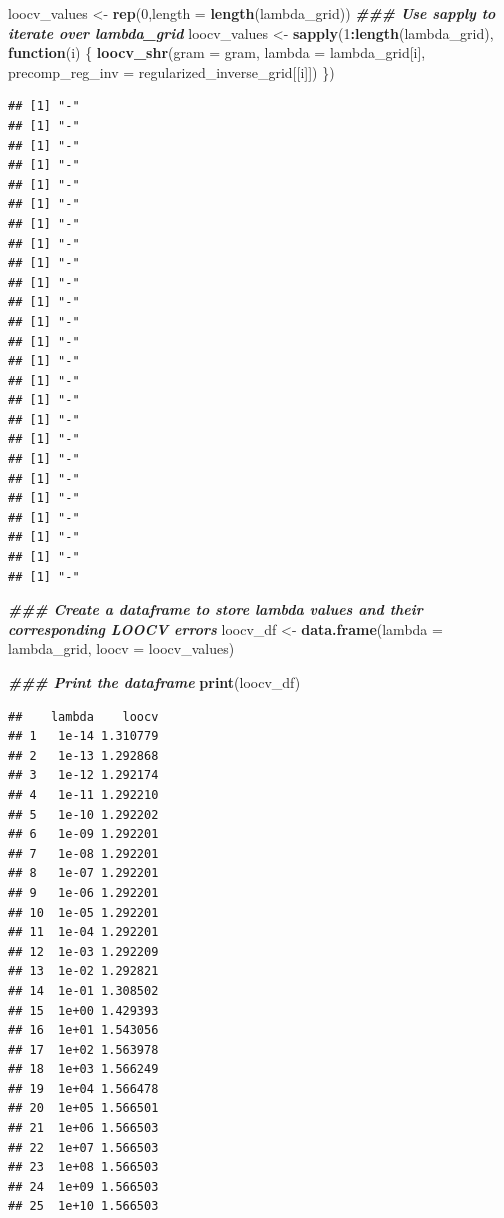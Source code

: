 \documentclass[
]{article}
\newenvironment{Shaded}{\begin{snugshade}}{\end{snugshade}}
\newcommand{\AttributeTok}[1]{\textcolor[rgb]{0.13,0.29,0.53}{#1}}
\newcommand{\ControlFlowTok}[1]{\textcolor[rgb]{0.13,0.29,0.53}{\textbf{#1}}}
\newcommand{\DecValTok}[1]{\textcolor[rgb]{0.00,0.00,0.81}{#1}}
\newcommand{\DocumentationTok}[1]{\textcolor[rgb]{0.56,0.35,0.01}{\textbf{\textit{#1}}}}
\newcommand{\FunctionTok}[1]{\textcolor[rgb]{0.13,0.29,0.53}{\textbf{#1}}}
\newcommand{\NormalTok}[1]{#1}
\newcommand{\OtherTok}[1]{\textcolor[rgb]{0.56,0.35,0.01}{#1}}
\newcommand{\SpecialCharTok}[1]{\textcolor[rgb]{0.81,0.36,0.00}{\textbf{#1}}}
\begin{document}
\begin{Shaded}
\begin{Highlighting}[]
\NormalTok{loocv\_values }\OtherTok{\textless{}{-}} \FunctionTok{rep}\NormalTok{(}\DecValTok{0}\NormalTok{,}\AttributeTok{length =} \FunctionTok{length}\NormalTok{(lambda\_grid))}
\DocumentationTok{\#\#\# Use sapply to iterate over lambda\_grid}
\NormalTok{loocv\_values }\OtherTok{\textless{}{-}} \FunctionTok{sapply}\NormalTok{(}\DecValTok{1}\SpecialCharTok{:}\FunctionTok{length}\NormalTok{(lambda\_grid), }\ControlFlowTok{function}\NormalTok{(i) \{}
  \FunctionTok{loocv\_shr}\NormalTok{(}\AttributeTok{gram =}\NormalTok{ gram, }\AttributeTok{lambda =}\NormalTok{ lambda\_grid[i], }\AttributeTok{precomp\_reg\_inv =}\NormalTok{ regularized\_inverse\_grid[[i]])}
\NormalTok{\})}
\end{Highlighting}
\end{Shaded}

\begin{verbatim}
## [1] "-"
## [1] "-"
## [1] "-"
## [1] "-"
## [1] "-"
## [1] "-"
## [1] "-"
## [1] "-"
## [1] "-"
## [1] "-"
## [1] "-"
## [1] "-"
## [1] "-"
## [1] "-"
## [1] "-"
## [1] "-"
## [1] "-"
## [1] "-"
## [1] "-"
## [1] "-"
## [1] "-"
## [1] "-"
## [1] "-"
## [1] "-"
## [1] "-"
\end{verbatim}

\begin{Shaded}
\begin{Highlighting}[]
\DocumentationTok{\#\#\# Create a dataframe to store lambda values and their corresponding LOOCV errors}
\NormalTok{loocv\_df }\OtherTok{\textless{}{-}} \FunctionTok{data.frame}\NormalTok{(}\AttributeTok{lambda =}\NormalTok{ lambda\_grid, }\AttributeTok{loocv =}\NormalTok{ loocv\_values)}

\DocumentationTok{\#\#\# Print the dataframe}
\FunctionTok{print}\NormalTok{(loocv\_df)}
\end{Highlighting}
\end{Shaded}

\begin{verbatim}
##    lambda    loocv
## 1   1e-14 1.310779
## 2   1e-13 1.292868
## 3   1e-12 1.292174
## 4   1e-11 1.292210
## 5   1e-10 1.292202
## 6   1e-09 1.292201
## 7   1e-08 1.292201
## 8   1e-07 1.292201
## 9   1e-06 1.292201
## 10  1e-05 1.292201
## 11  1e-04 1.292201
## 12  1e-03 1.292209
## 13  1e-02 1.292821
## 14  1e-01 1.308502
## 15  1e+00 1.429393
## 16  1e+01 1.543056
## 17  1e+02 1.563978
## 18  1e+03 1.566249
## 19  1e+04 1.566478
## 20  1e+05 1.566501
## 21  1e+06 1.566503
## 22  1e+07 1.566503
## 23  1e+08 1.566503
## 24  1e+09 1.566503
## 25  1e+10 1.566503
\end{verbatim}
\end{document}
